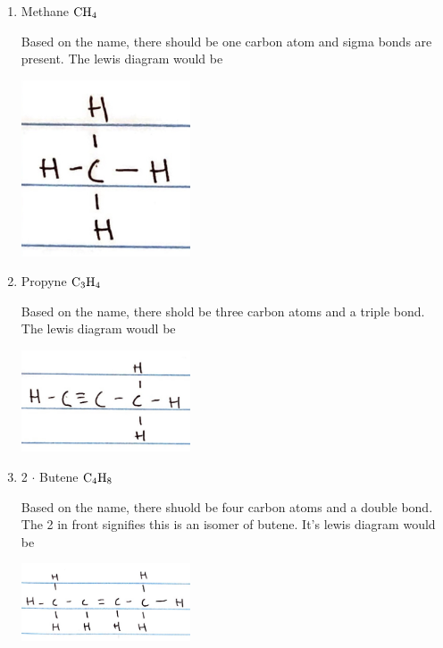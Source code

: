 \documentclass{scrartcl}
\begin{document}
\begin{enumerate}
\item Methane \(\ce{CH4}\)

Based on the name, there should be one carbon atom and sigma bonds are
present. The lewis diagram would be

\begin{center}
\includegraphics[width=5cm]{./images/7.JPG}
\end{center}

\item Propyne \(\ce{C3H4}\)

Based on the name, there shold be three carbon atoms and a triple bond. The
lewis diagram woudl be

\begin{center}
\includegraphics[width=5cm]{./images/8.JPG}
\end{center}

\item 2 \(\cdot\) Butene \(\ce{C4H8}\)

Based on the name, there shuold be four carbon atoms and a double bond. The 2
in front signifies this is an isomer of butene. It's lewis diagram would be

\begin{center}
\includegraphics[width=5cm]{./images/9.JPG}
\end{center}
\end{enumerate}
\end{document}
